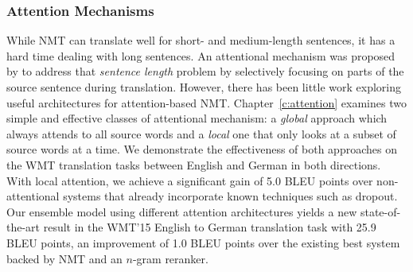 \subsubsection{Attention Mechanisms} 
While NMT can translate well for short- and medium-length sentences, it 
has a hard time dealing with long sentences.
An attentional mechanism was proposed by  to address that {\it
sentence length} problem by
selectively focusing on parts of the source sentence during translation. However,
there has been little work exploring useful architectures for attention-based
NMT. Chapter~\ref{c:attention} examines two simple and effective classes of attentional
mechanism: a {\it global} approach which always attends to all source words and
a {\it local} one that only looks at a subset of source words at a time. 
We demonstrate the effectiveness of both approaches on the WMT translation
tasks between English and German in both directions. With local
attention, we achieve a significant gain of 5.0 BLEU points over
non-attentional systems that 
already incorporate known techniques such as dropout. Our ensemble 
model using different attention architectures yields a new
state-of-the-art result in the WMT'15 English to German
translation task with 25.9 BLEU points, an improvement of 1.0 BLEU points over the existing
best system backed by NMT and an $n$-gram reranker.

